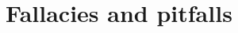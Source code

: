 \begin{enumerate}
%
%
%
%
%
%
\end{enumerate}


\section{~Fallacies and pitfalls }\label{sec:fallacies} 

